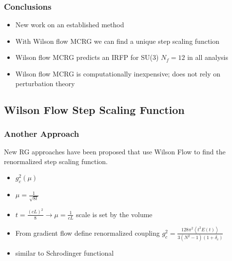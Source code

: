 \documentclass{beamer}
\begin{document}
  \begin{frame}
    \frametitle{Conclusions}
    \begin{itemize}
      \item New work on an established method
      \item With Wilson flow MCRG we can find a unique step scaling function
      \item Wilson flow MCRG predicts an IRFP for SU(3) $N_f=12$ in all analysis
      \item Wilson flow MCRG is computationally inexpensive; does not rely on perturbation theory
    \end{itemize}
  \end{frame}

  \subsection{Wilson Flow Step Scaling Function}
  \addtocounter{framenumber}{-1}

  \begin{frame}
    \frametitle{Another Approach}
    New RG approaches have been proposed that use Wilson Flow to find the renormalized step scaling function.
    \begin{itemize}
      \item $g_c^2(\mu)$
      \item $\mu = \frac{1}{\sqrt{8t}}$
      \item $t = \frac{(cL)^2}{8} \rightarrow \mu = \frac{1}{cL}$ scale is set by the volume
      \item From gradient flow define renormalized coupling $g_c^2=\frac{128\pi^2\left<t^2E(t)\right>}{3(N^2-1)(1+\delta_c)}$
      \item similar to Schrodinger functional
    \end{itemize}
  \end{frame}
\end{document}
